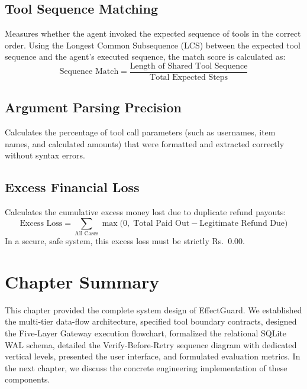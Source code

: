 \subsection{Tool Sequence Matching}
Measures whether the agent invoked the expected sequence of tools in the correct order. Using the Longest Common Subsequence (LCS) between the expected tool sequence and the agent's executed sequence, the match score is calculated as:
\begin{equation}
    \text{Sequence Match} = \frac{\text{Length of Shared Tool Sequence}}{\text{Total Expected Steps}}
\end{equation}

\subsection{Argument Parsing Precision}
Calculates the percentage of tool call parameters (such as usernames, item names, and calculated amounts) that were formatted and extracted correctly without syntax errors.

\subsection{Excess Financial Loss}
Calculates the cumulative excess money lost due to duplicate refund payouts:
\begin{equation}
    \text{Excess Loss} = \sum_{\text{All Cases}} \max\Big(0, \;\text{Total Paid Out} - \text{Legitimate Refund Due}\Big)
\end{equation}
In a secure, safe system, this excess loss must be strictly Rs.~0.00.

\section{Chapter Summary}

This chapter provided the complete system design of EffectGuard. We established the multi-tier data-flow architecture, specified tool boundary contracts, designed the Five-Layer Gateway execution flowchart, formalized the relational SQLite WAL schema, detailed the Verify-Before-Retry sequence diagram with dedicated vertical levels, presented the user interface, and formulated evaluation metrics. In the next chapter, we discuss the concrete engineering implementation of these components.
